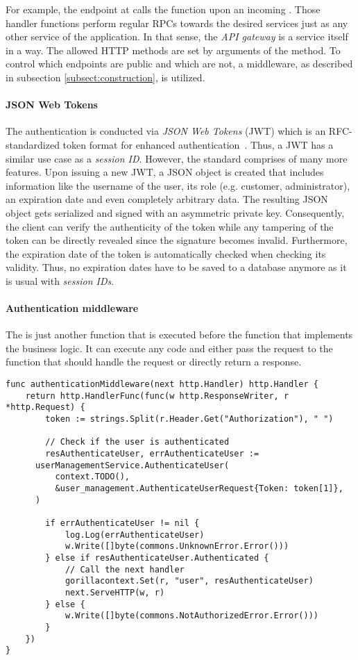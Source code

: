 \documentclass[12pt,a4paper,twoside]{report}
\begin{document}
For example, the endpoint at  calls the function
 upon an incoming .
Those handler functions perform regular RPCs towards the desired services just
as any other service of the application. In that sense, the \textit{API gateway}
is a service itself in a way.
The allowed HTTP methods are set by arguments of the  method.
To control which endpoints are public and which are not, a middleware, as described
in subsection \ref{subsect:construction}, is utilized.

\paragraph{JSON Web Tokens}
The authentication is conducted via \textit{JSON Web Tokens} (JWT) which is
an RFC-standardized token format for enhanced authentication~\cite{jwt-rfc}.
Thus, a JWT has a similar use case as a \textit{session ID}.
However, the standard comprises of many more features.
Upon issuing a new JWT, a JSON object is created that includes information
like the username of the user, its role (e.g. customer, administrator), an
expiration date and even completely arbitrary data.
The resulting JSON object gets serialized and signed with an asymmetric
private key. Consequently, the client can verify the authenticity of the token
while any tampering of the token can be directly revealed since the signature becomes
invalid. Furthermore, the expiration date of the token is automatically checked
when checking its validity. Thus, no expiration dates have to be saved to
a database anymore as it is usual with \textit{session IDs}.

\paragraph{Authentication middleware}
The  is just another function that is executed
before the function that implements the business logic.
It can execute any code and either pass the request to the function that should
handle the request or directly return a response.

\begin{lstlisting}[title=api-gateway/middlewares.go]
func authenticationMiddleware(next http.Handler) http.Handler {
	return http.HandlerFunc(func(w http.ResponseWriter, r *http.Request) {
		token := strings.Split(r.Header.Get("Authorization"), " ")

		// Check if the user is authenticated
		resAuthenticateUser, errAuthenticateUser :=
      userManagementService.AuthenticateUser(
          context.TODO(),
          &user_management.AuthenticateUserRequest{Token: token[1]},
      )

		if errAuthenticateUser != nil {
			log.Log(errAuthenticateUser)
			w.Write([]byte(commons.UnknownError.Error()))
		} else if resAuthenticateUser.Authenticated {
			// Call the next handler
			gorillacontext.Set(r, "user", resAuthenticateUser)
			next.ServeHTTP(w, r)
		} else {
			w.Write([]byte(commons.NotAuthorizedError.Error()))
		}
	})
}
\end{lstlisting}
\end{document}

